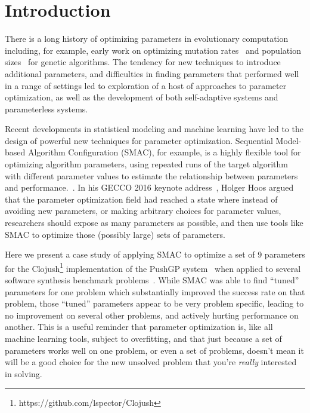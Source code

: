 \section{Introduction}
\label{sec:introduction}

There is a long history of optimizing parameters in evolutionary computation
including, for example, early work on optimizing mutation rates~\cite{back1993optimal} and 
population sizes~\cite{alander1992optimal} for genetic algorithms.
The tendency for new techniques to introduce additional parameters, 
and difficulties in finding parameters that performed well in a range of
settings led to exploration of a host of approaches to parameter
optimization, as well as the development of both self-adaptive systems
and parameterless systems.~\cite{lobo2007parameter}

Recent developments in statistical modeling and machine learning have
led to the design of powerful new techniques for parameter optimization. 
Sequential Model-based Algorithm Configuration (SMAC), for example, is a
highly flexible tool for optimizing algorithm parameters, using repeated runs
of the target algorithm with different parameter values to estimate
the relationship between parameters and performance.~\cite{HutHooLey11-SMAC}. In his GECCO 2016 keynote 
address~\cite{Hoos:2016:TCM:2908812.2908960}, Holger Hoos argued
that the parameter optimization field had reached a state where 
instead of avoiding new
parameters, or making arbitrary choices for parameter values, researchers
should expose as many parameters as possible, and then use tools like
SMAC to optimize those (possibly large) sets of parameters.

Here we present a case study of applying SMAC to optimize a
set of 9 parameters for the Clojush\footnote{https://github.com/lspector/Clojush} 
implementation of the PushGP system~\cite{spector:2002:GPEM,push3gecco}
when applied to several software synthesis 
benchmark problems~\cite{Helmuth:2015:GECCO}. While SMAC was able to
find ``tuned'' parameters for one problem which substantially improved
the success rate on that problem, those ``tuned'' parameters appear to
be very problem specific, leading to no improvement on several other
problems, and actively hurting performance on another. This is a useful
reminder that parameter optimization is, like all machine learning tools,
subject to overfitting, and that just because a set of parameters works 
well on one problem, or even a set of problems, doesn't mean it will be
a good choice for the new unsolved problem that you're \emph{really}
interested in solving.

